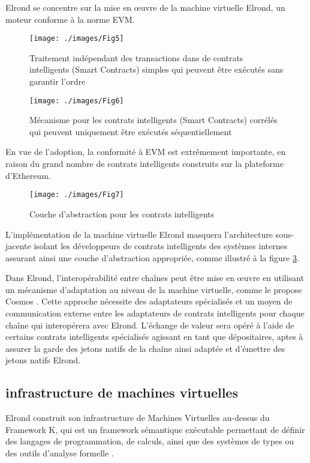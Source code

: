 \documentclass[journal]{IEEEtran}
\begin{document}
Elrond se concentre sur la mise en œuvre de la machine virtuelle Elrond, un moteur conforme à la norme EVM. 

\begin{figure}[h]
	\texttt{[image: ./images/Fig5]} %
	\caption{Traitement indépendant des transactions dans de contrats intelligents (Smart Contracts) simples qui peuvent être exécutés sans garantir l'ordre} %
	\label{Fig.5} %
\end{figure}

\begin{figure}[h]
	\texttt{[image: ./images/Fig6]} %
	\caption{Mécanisme pour les contrats intelligents (Smart Contracts) corrélés qui peuvent uniquement être exécutés séquentiellement} %
	\label{Fig.6} %
\end{figure}

En vue de l'adoption, la conformité à EVM est extrêmement importante, en raison du grand nombre de contrats intelligents construits sur la plateforme d'Ethereum.

\begin{figure}[h]
	\texttt{[image: ./images/Fig7]} %
	\caption{Couche d'abstraction pour les contrats intelligents} %
	\label{Fig.7} %
\end{figure}

L'implémentation de la machine virtuelle Elrond masquera l'architecture sous-jacente isolant les développeurs de contrats intelligents des systèmes internes assurant ainsi une couche d'abstraction appropriée, comme illustré à la figure  \ref{Fig.7}.

Dans Elrond, l'interopérabilité entre chaînes peut être mise en œuvre en utilisant un mécanisme d'adaptation au niveau de la machine virtuelle, comme le propose Cosmos \cite{38}. Cette approche nécessite des adaptateurs spécialisés et un moyen de communication externe entre les adaptateurs de contrats intelligents pour chaque chaîne qui interopérera avec Elrond. L'échange de valeur sera opéré à l'aide de certains contrats intelligents spécialisés agissant en tant que dépositaires, aptes à assurer la garde des jetons natifs de la chaîne ainsi adaptée et d'émettre des jetons natifs Elrond.

\subsection{infrastructure de machines virtuelles}
Elrond construit son infrastructure de Machines Virtuelles au-dessus du Framework K, qui est un framework sémantique exécutable permettant de définir des langages de programmation, de calculs, ainsi que des systèmes de types ou des outils d'analyse formelle \cite{39}.
\end{document}
